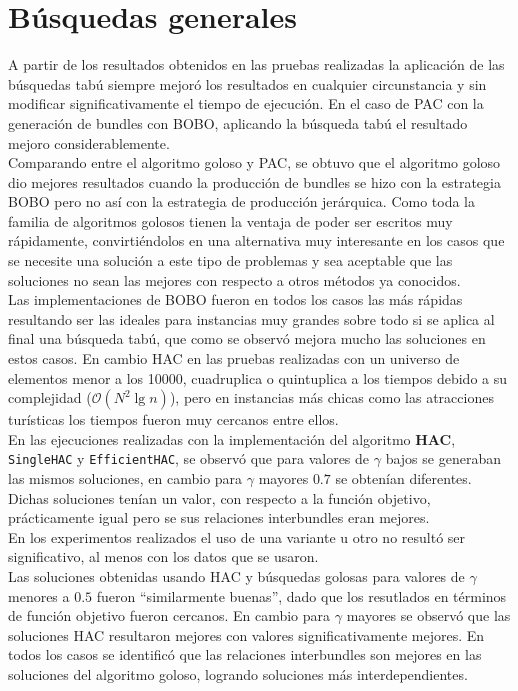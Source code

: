 \section{Búsquedas generales}
A partir de los resultados obtenidos en las pruebas realizadas la aplicación de las búsquedas tabú siempre mejoró los resultados en cualquier circunstancia y sin modificar significativamente el tiempo de ejecución. En el caso de PAC con la generación de bundles con BOBO, aplicando la búsqueda tabú el resultado mejoro considerablemente.\\
Comparando entre el algoritmo goloso y PAC, se obtuvo que el algoritmo goloso dio mejores resultados cuando la producción de bundles se hizo con la estrategia BOBO pero no así con la estrategia de producción jerárquica. Como toda la familia de algoritmos golosos tienen la ventaja de poder ser escritos muy rápidamente, convirtiéndolos en una alternativa muy interesante en los casos que se necesite una solución a este tipo de problemas y sea aceptable que las soluciones no sean las mejores con respecto a otros métodos ya conocidos.\\
Las implementaciones de BOBO fueron en todos los casos las más rápidas resultando ser las ideales para instancias muy grandes sobre todo si se aplica al final una búsqueda tabú, que como se observó mejora mucho las soluciones en estos casos. En cambio HAC en las pruebas realizadas con un universo de elementos menor a los 10000, cuadruplica o quintuplica a los tiempos debido a su complejidad ($\mathcal{O}(N^{2}\lg n)$), pero en instancias más chicas como las atracciones turísticas los tiempos fueron muy cercanos entre ellos.\\
En las ejecuciones realizadas con la implementación del algoritmo \textbf{HAC}, \texttt{SingleHAC} y \texttt{EfficientHAC}, se observó que para valores de $\gamma$ bajos se generaban las mismos soluciones, en cambio para $\gamma$ mayores $0.7$ se obtenían diferentes. Dichas soluciones tenían un valor, con respecto a la función objetivo, prácticamente igual pero se sus relaciones interbundles eran mejores.\\
En los experimentos realizados el uso de una variante u otro no resultó ser significativo, al menos con los datos que se usaron.\\
Las soluciones obtenidas usando HAC y búsquedas golosas para valores de $\gamma$ menores a $0.5$ fueron \textquotedblleft similarmente buenas\textquotedblright , dado que los resutlados en términos de función objetivo fueron cercanos. En cambio para $\gamma$ mayores se observó que las soluciones HAC resultaron mejores con valores significativamente mejores. En todos los casos se identificó que las relaciones interbundles son mejores en las soluciones del algoritmo goloso, logrando soluciones más interdependientes.

